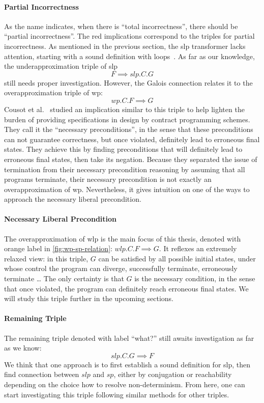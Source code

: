 \paragraph{Partial Incorrectness}
As the name indicates, when there is ``total incorrectness'', there should be ``partial incorrectness''. 
The red implications correspond to the triples for partial incorrectness. 
As mentioned in the previous section, the slp transformer lacks attention, starting with a sound definition with loops~\cite{wulandari2020VerifyingGraphPrograms,li2011NonlinearMathematicsUncertainty}. 
As far as our knowledge, the underapproximation triple of slp 
$$F\implies slp.C.G$$ 
still needs proper investigation. 
However, the Galois connection relates it to the overapproximation triple of wp: 
$$wp.C.F\implies G$$
Cousot et al.~\cite{cousot13} studied an implication similar to this triple to help lighten the burden of providing specifications in design by contract programming schemes. 
They call it the ``necessary preconditions'', in the sense that these preconditions can not guarantee correctness, but once violated, definitely lead to erroneous final states. 
They achieve this by finding preconditions that will definitely lead to erroneous final states, then take its negation. 
Because they separated the issue of termination from their necessary precondition reasoning by assuming that all programs terminate, their necessary precondition is not exactly an overapproximation of wp. 
Nevertheless, it gives intuition on one of the ways to approach the necessary liberal precondition. 

\paragraph{Necessary Liberal Precondition}
The overapproximation of wlp is the main focus of this thesis, denoted with orange label in \autoref{fig:wp-sp-relation}: 
$wlp.C.F\implies G$. 
It reflexes an extremely relaxed view: in this triple, $G$ can be satisfied by all possible initial states, under whose control the program can diverge, successfully terminate, erroneously terminate \dots
The only certainty is that $G$ is the necessary condition, in the sense that once violated, the program can definitely reach erroneous final states. 
We will study this triple further in the upcoming sections. 

\paragraph{Remaining Triple}
The remaining triple denoted with label ``what?'' still awaits investigation as far as we know: 
$$slp.C.G\implies F$$
We think that one approach is to first establish a sound definition for slp, then find connection between $slp$ and $sp$, either by conjugation or reachability depending on the choice how to resolve non-determinism. 
From here, one can start investigating this triple following similar methods for other triples. 

